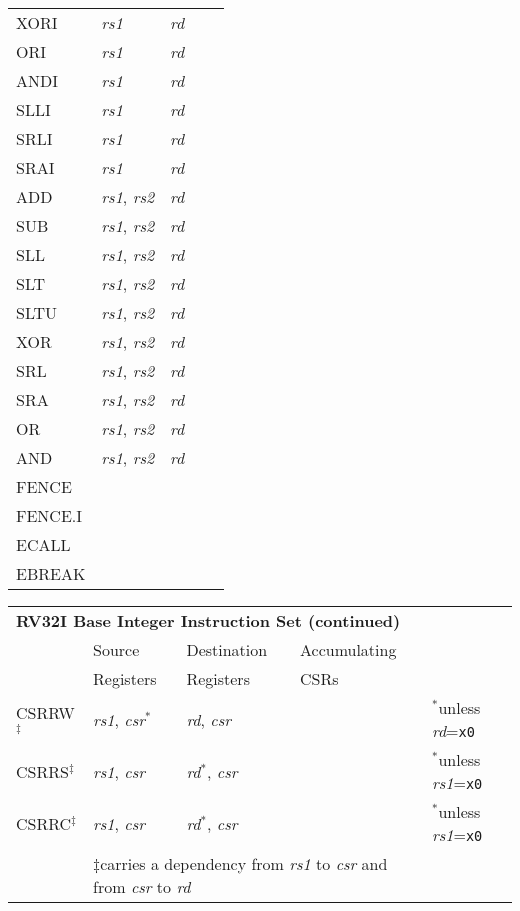 \begin{tabular}{p{3cm}|p{25mm}|p{3cm}|p{4cm}|p{4cm}}
   \cline{2-4}
   XORI & {\em rs1} & {\em rd} &   & \\
   \cline{2-4}
   ORI & {\em rs1} & {\em rd} &   & \\
   \cline{2-4}
   ANDI & {\em rs1} & {\em rd} &   & \\
   \cline{2-4}
   SLLI & {\em rs1} & {\em rd} &   & \\
   \cline{2-4}
   SRLI & {\em rs1} & {\em rd} &   & \\
   \cline{2-4}
   SRAI & {\em rs1} & {\em rd} &   & \\
   \cline{2-4}
   ADD & {\em rs1}, {\em rs2} & {\em rd} &   & \\
   \cline{2-4}
   SUB & {\em rs1}, {\em rs2} & {\em rd} &   & \\
   \cline{2-4}
   SLL & {\em rs1}, {\em rs2} & {\em rd} &   & \\
   \cline{2-4}
   SLT & {\em rs1}, {\em rs2} & {\em rd} &   & \\
   \cline{2-4}
   SLTU & {\em rs1}, {\em rs2} & {\em rd} &   & \\
   \cline{2-4}
   XOR & {\em rs1}, {\em rs2} & {\em rd} &   & \\
   \cline{2-4}
   SRL & {\em rs1}, {\em rs2} & {\em rd} &   & \\
   \cline{2-4}
   SRA & {\em rs1}, {\em rs2} & {\em rd} &   & \\
   \cline{2-4}
   OR & {\em rs1}, {\em rs2} & {\em rd} &   & \\
   \cline{2-4}
   AND & {\em rs1}, {\em rs2} & {\em rd} &   & \\
   \cline{2-4}
   FENCE &  &  &   & \\
   \cline{2-4}
   FENCE.I &  &  &   & \\
   \cline{2-4}
   ECALL &  &  &   & \\
   \cline{2-4}
   EBREAK &  &  &   & \\
   \cline{2-4}
\end{tabular}

\begin{tabular}{p{3cm}|p{25mm}|p{3cm}|p{4cm}|p{4cm}}
  \multicolumn{4}{l}{\bf RV32I Base Integer Instruction Set (continued)} \\
  \cline{2-4}
   & Source    & Destination & Accumulating \\
   & Registers & Registers   & CSRs \\
  \cline{2-4}
   CSRRW$^\ddagger$ & {\em rs1}, {\em csr}$^*$ & {\em rd}, {\em csr} & & $^*$unless {\em rd}={\tt x0}  \\
   \cline{2-4}
   CSRRS$^\ddagger$ & {\em rs1}, {\em csr} & {\em rd}$^*$, {\em csr} & & $^*$unless {\em rs1}={\tt x0}  \\
   \cline{2-4}
   CSRRC$^\ddagger$ & {\em rs1}, {\em csr} & {\em rd}$^*$, {\em csr} & & $^*$unless {\em rs1}={\tt x0}  \\
   \cline{2-4}
   \multicolumn{1}{c}{} & \multicolumn{3}{l}{$\ddagger$carries a dependency from {\em rs1} to {\em csr} and from {\em csr} to {\em rd}}
\end{tabular}

